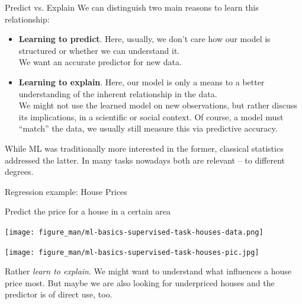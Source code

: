 \documentclass[11pt,compress,t,notes=noshow, xcolor=table]{beamer}
\begin{document}
\begin{vbframe}{Predict vs. Explain}
We can distinguish two main reasons to learn this relationship:


\begin{itemize}
    \item \textbf{Learning to predict}. Here, usually, we don't care how
        our model is structured or whether we can understand it.\\
        We want an accurate predictor for new data.

    \item \textbf{Learning to explain}. Here, our model is only a means to 
        a better understanding of the inherent relationship in the data.\\
        We might not use the learned model on new observations, but rather 
        discuss its implications, in a scientific or social context.
        Of course, a model must ``match'' the data, we usually still measure this via predictive accuracy. 

\end{itemize}  

\lz

While ML was traditionally more interested in the former, classical statistics
addressed the latter. In many tasks nowadays both are relevant -- to different degrees.

\end{vbframe}
  

\begin{vbframe}{Regression example: House Prices}


  Predict the price for a house in a certain area
    
    
    \begin{center}
    \texttt{[image: figure\_man/ml-basics-supervised-task-houses-data.png]} 
    
    \lz
    
    \texttt{[image: figure\_man/ml-basics-supervised-task-houses-pic.jpg]} 
    
    \end{center}

    Rather \textit{learn to explain}. We might want to understand what influences 
    a house price most. But maybe we are also looking for underpriced houses and
    the predictor is of direct use, too.
    

\end{vbframe}
\end{document}
